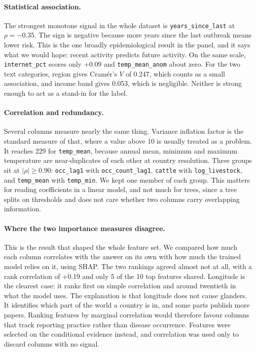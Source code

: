 \documentclass[10pt]{article}
\begin{document}
\paragraph{Statistical association.} The strongest monotone signal in the whole dataset is
\texttt{years\_since\_last} at $\rho = -0.35$. The sign is negative because more years
since the last outbreak means lower risk. This is the one broadly epidemiological result in
the panel, and it says what we would hope: recent activity predicts future activity. On the
same scale, \texttt{internet\_pct} scores only $+0.09$ and \texttt{temp\_mean\_anom} about
zero. For the two text categories, region gives Cram\'er's $V$ of 0.247, which counts
as a small association, and income band gives 0.053, which is negligible. Neither is
strong enough to act as a stand-in for the label.

\paragraph{Correlation and redundancy.} Several columns measure nearly the same thing.
Variance inflation factor is the standard measure of that, where a value above 10 is
usually treated as a problem. It reaches 229 for \texttt{temp\_mean}, because annual mean,
minimum and maximum temperature are near-duplicates of each other at country resolution.
Three groups sit at $|\rho| \geq 0.90$: \texttt{occ\_lag1} with \texttt{occ\_count\_lag1},
\texttt{cattle} with \texttt{log\_livestock}, and \texttt{temp\_mean} with \texttt{temp\_min}.
We kept one member of each group. This matters for reading coefficients in a linear model,
and not much for trees, since a tree splits on thresholds and does not care whether two
columns carry overlapping information.

\paragraph{Where the two importance measures disagree.} This is the result that shaped the
whole feature set. We compared how much each column correlates with the answer on its own
with how much the trained model relies on it, using SHAP. The two rankings agreed
almost not at all, with a rank correlation of +0.19 and only 5 of the 10 top features
shared. Longitude is the clearest case: it ranks first on simple correlation and around
twentieth in what the model uses. The explanation is that longitude does not cause
glanders. It identifies which part of the world a country is in, and some parts publish
more papers. Ranking features by marginal correlation would therefore favour columns that
track reporting practice rather than disease occurrence. Features were selected on the
conditional evidence instead, and correlation was used only to discard columns with no
signal.
\end{document}
